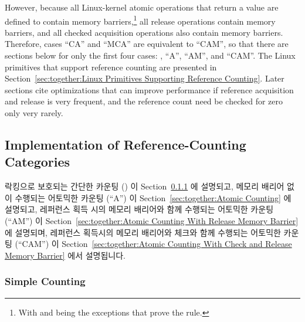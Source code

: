 However, because all Linux-kernel atomic operations that return a
value are defined to contain memory barriers,\footnote{
	With  and  being the
	exceptions that prove the rule.}
all release operations
contain memory barriers, and all checked acquisition operations also
contain memory barriers.
Therefore, cases ``CA'' and ``MCA'' are equivalent to ``CAM'', so that
there are sections below for only the first four cases:
, ``A'', ``AM'', and ``CAM''.
The Linux primitives that support reference counting are presented in
Section~\ref{sec:together:Linux Primitives Supporting Reference Counting}.
Later sections cite optimizations that can improve performance
if reference acquisition and release is very frequent, and the
reference count need be checked for zero only very rarely.
\fi

\subsection{Implementation of Reference-Counting Categories}
\label{sec:together:Implementation of Reference-Counting Categories}

락킹으로 보호되는 간단한 카운팅 () 이
Section~\ref{sec:together:Simple Counting} 에 설명되고,
메모리 배리어 없이 수행되는 어토믹한 카운팅 (``A'') 이
Section~\ref{sec:together:Atomic Counting} 에 설명되고,
레퍼런스 획득 시의 메모리 배리어와 함께 수행되는 어토믹한 카운팅 (``AM'') 이
Section~\ref{sec:together:Atomic Counting With Release Memory Barrier} 에 설명되며,
레퍼런스 획득시의 메모리 배리어와 체크와 함께 수행되는 어토믹한 카운팅 (``CAM'') 이
Section~\ref{sec:together:Atomic Counting With Check and Release Memory Barrier}
에서 설명됩니다.
\iffalse

Simple counting protected by locking (\makebox{``-''}) is described in
Section~\ref{sec:together:Simple Counting},
atomic counting with no memory barriers (``A'') is described in
Section~\ref{sec:together:Atomic Counting},
atomic counting with acquisition memory barrier (``AM'') is described in
Section~\ref{sec:together:Atomic Counting With Release Memory Barrier},
and
atomic counting with check and release memory barrier (``CAM'') is described in
Section~\ref{sec:together:Atomic Counting With Check and Release Memory Barrier}.
\fi

\subsubsection{Simple Counting}
\label{sec:together:Simple Counting}

